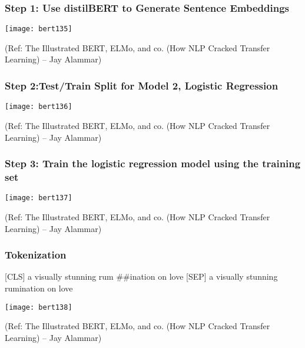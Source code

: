 \begin{frame}[fragile]\frametitle{ Step 1: Use distilBERT to Generate Sentence Embeddings}

			\begin{center}
			\texttt{[image: bert135]}
			\end{center}	

{\tiny (Ref: The Illustrated BERT, ELMo, and co. (How NLP Cracked Transfer Learning) – Jay Alammar)}

\end{frame}

\begin{frame}[fragile]\frametitle{ Step 2:Test/Train Split for Model 2, Logistic Regression}

			\begin{center}
			\texttt{[image: bert136]}
			\end{center}	

{\tiny (Ref: The Illustrated BERT, ELMo, and co. (How NLP Cracked Transfer Learning) – Jay Alammar)}

\end{frame}

\begin{frame}[fragile]\frametitle{ Step 3: Train the logistic regression model using the training set}

			\begin{center}
			\texttt{[image: bert137]}
			\end{center}	

{\tiny (Ref: The Illustrated BERT, ELMo, and co. (How NLP Cracked Transfer Learning) – Jay Alammar)}

\end{frame}

\begin{frame}[fragile]\frametitle{ Tokenization}

[CLS] a visually stunning rum \#\#ination on love [SEP]
a visually stunning rumination on love


			\begin{center}
			\texttt{[image: bert138]}
			\end{center}	

{\tiny (Ref: The Illustrated BERT, ELMo, and co. (How NLP Cracked Transfer Learning) – Jay Alammar)}

\end{frame}

